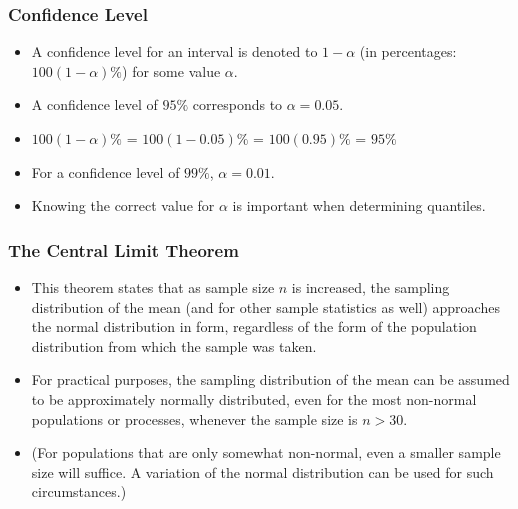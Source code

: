 \documentclass[a4]{beamer}
\begin{document}


\begin{frame}
\frametitle{Confidence Level}

\begin{itemize}
\item A confidence level for an interval is denoted to $1-\alpha$ (in percentages: $100(1-\alpha)\%$) for some value $\alpha$.
\item A confidence level of $95\%$ corresponds to $\alpha = 0.05$.
\item $100(1-\alpha)\%$ = $100(1-0.05)\%$  = $100(0.95)\%$ = $95\%$
\item For a confidence level of $99\%$, $\alpha = 0.01$.
\item Knowing the correct value for $\alpha$ is important when determining quantiles.
\end{itemize}

\end{frame}


\begin{frame}
\frametitle{The Central Limit Theorem}
\begin{itemize}
\item This theorem states that as sample size $n$ is increased, the sampling distribution of the mean (and for other sample statistics as well) approaches the normal distribution in form, regardless of the form of the population distribution from
which the sample was taken.

\item For practical purposes, the sampling distribution of the mean can be assumed to be
approximately normally distributed, even for the most non-normal populations or processes, whenever the
sample size is $n > 30$.

\item (For populations that are only somewhat non-normal, even a smaller sample size will
suffice. A variation of the normal distribution can be used for such circumstances.)
\end{itemize}


\end{frame}
\end{document}
